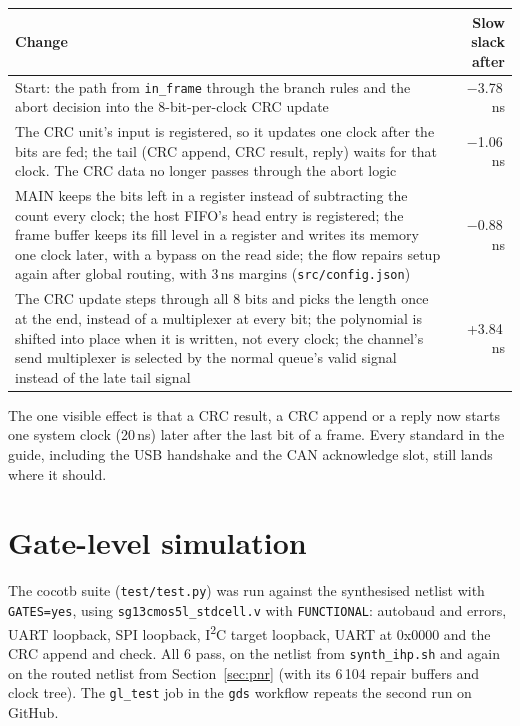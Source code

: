 \documentclass[11pt,a4paper]{article}
\newcommand{\sig}[1]{\texttt{#1}}
\begin{document}
\begin{center}
\begin{tabularx}{\linewidth}{@{}L r@{}}
\toprule
Change & Slow slack after \\
\midrule
Start: the path from \sig{in\_frame} through the branch rules and the abort decision into the 8-bit-per-clock CRC update & $-$3.78\,ns \\
The CRC unit's input is registered, so it updates one clock after the bits are fed; the tail (CRC append, CRC result, reply) waits for that clock. The CRC data no longer passes through the abort logic & $-$1.06\,ns \\
MAIN keeps the bits left in a register instead of subtracting the count every clock; the host FIFO's head entry is registered; the frame buffer keeps its fill level in a register and writes its memory one clock later, with a bypass on the read side; the flow repairs setup again after global routing, with 3\,ns margins (\sig{src/config.json}) & $-$0.88\,ns \\
The CRC update steps through all 8 bits and picks the length once at the end, instead of a multiplexer at every bit; the polynomial is shifted into place when it is written, not every clock; the channel's send multiplexer is selected by the normal queue's valid signal instead of the late tail signal & +3.84\,ns \\
\bottomrule
\end{tabularx}
\end{center}

The one visible effect is that a CRC result, a CRC append or a reply now starts one system clock (20\,ns) later after the last bit of a frame. Every standard in the guide, including the USB handshake and the CAN acknowledge slot, still lands where it should.

\section{Gate-level simulation}

The cocotb suite (\sig{test/test.py}) was run against the synthesised netlist with \sig{GATES=yes}, using \sig{sg13cmos5l\_stdcell.v} with \sig{FUNCTIONAL}: autobaud and errors, UART loopback, SPI loopback, I\textsuperscript{2}C target loopback, UART at 0x0000 and the CRC append and check. All 6 pass, on the netlist from \sig{synth\_ihp.sh} and again on the routed netlist from Section~\ref{sec:pnr} (with its 6\,104 repair buffers and clock tree). The \sig{gl\_test} job in the \sig{gds} workflow repeats the second run on GitHub.
\end{document}

